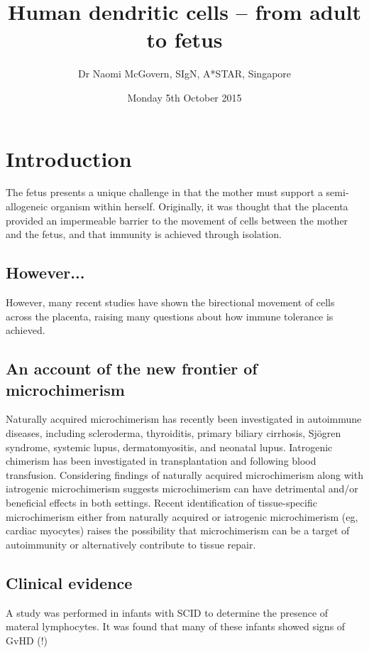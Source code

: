 \documentclass[a4paper]{article}
\title{Human dendritic cells – from adult to fetus}
\author{Dr Naomi McGovern, SIgN, A*STAR, Singapore}
\date{Monday 5th October 2015}
\begin{document}
    \maketitle

    \section{Introduction}
The fetus presents a unique challenge in that the mother must support a semi-allogeneic organism within herself. Originally, it was thought that the placenta provided an impermeable barrier to the movement of cells between the mother and the fetus, and that immunity is achieved through isolation.

\subsection{However...}
However, many recent studies have shown the birectional movement of cells across the placenta, raising many questions about how immune tolerance is achieved. \cite{pmid14996783}

\subsection{An account of the new frontier of microchimerism}
Naturally acquired microchimerism has recently been investigated in autoimmune diseases, including scleroderma, thyroiditis, primary biliary cirrhosis, Sjögren syndrome, systemic lupus, dermatomyositis, and neonatal lupus. Iatrogenic chimerism has been investigated in transplantation and following blood transfusion. Considering findings of naturally acquired microchimerism along with iatrogenic microchimerism suggests microchimerism can have detrimental and/or beneficial effects in both settings. Recent identification of tissue-specific microchimerism either from naturally acquired or iatrogenic microchimerism (eg, cardiac myocytes) raises the possibility that microchimerism can be a target of autoimmunity or alternatively contribute to tissue repair. \cite{pmid19056990}

\subsection{Clinical evidence}
A study was performed in infants with SCID \cite{pmid11535520} to determine the presence of materal lymphocytes. It was found that many of these infants showed signs of GvHD (!)
\end{document}
